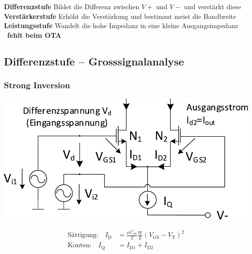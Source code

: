 \begin{outline}
    \1 \textbf{Differenzstufe}
        \2 Bildet die Differenz zwischen $V+$ und $V-$ und verstärkt diese
    \1 \textbf{Verstärkerstufe}
        \2 Erhöht die Verstärkung und bestimmt meist die Bandbreite
    \1 \textbf{Leistungsstufe}
        \2 Wandelt die hohe Impedanz in eine kleine Ausgangsimpedanz
            \textrightarrow\ \textbf{fehlt beim OTA}
\end{outline}






\subsection{Differenzstufe -- Grosssignalanalyse}

\subsubsection{Strong Inversion}

\begin{minipage}[t]{0.48\columnwidth}
    \includegraphics[width=\columnwidth, align=t]{images/09_differenzstufe_grosssignalanalyse.pdf}
\end{minipage}
\hfill
\begin{minipage}[t]{0.48\columnwidth}
    \begin{align*}
        \text{Sättigung:} \quad     I_\text{D}  &= \frac{\mu C_\text{ox}}{2} \frac{W}{L} (V_\text{GS} - V_\text{T})^2    \\
        \text{Konten:} \quad        I_\text{Q}  &= I_\text{D1} + I_\text{D2} 
    \end{align*}
\end{minipage}

